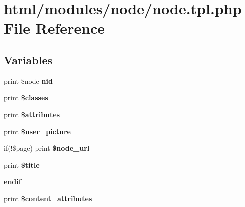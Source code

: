 \hypertarget{modules_2node_2node_8tpl_8php}{
\section{html/modules/node/node.tpl.php File Reference}
\label{modules_2node_2node_8tpl_8php}
}
\subsection*{Variables}
\begin{DoxyCompactItemize}
\item 
\hypertarget{modules_2node_2node_8tpl_8php_aff83bc4c67cdf5b085d181488eea273f}{
print \$node {\bfseries nid}}
\label{modules_2node_2node_8tpl_8php_aff83bc4c67cdf5b085d181488eea273f}

\item 
\hypertarget{modules_2node_2node_8tpl_8php_a6d48ecbdbc70ca1812e665169b5fa1e2}{
print {\bfseries \$classes}}
\label{modules_2node_2node_8tpl_8php_a6d48ecbdbc70ca1812e665169b5fa1e2}

\item 
\hypertarget{modules_2node_2node_8tpl_8php_a9c88c4272fa40546577b45392a0b3cd3}{
print {\bfseries \$attributes}}
\label{modules_2node_2node_8tpl_8php_a9c88c4272fa40546577b45392a0b3cd3}

\item 
\hypertarget{modules_2node_2node_8tpl_8php_a2662269aca0f9faedd1ee9e41828ea4c}{
print {\bfseries \$user\_\-picture}}
\label{modules_2node_2node_8tpl_8php_a2662269aca0f9faedd1ee9e41828ea4c}

\item 
\hypertarget{modules_2node_2node_8tpl_8php_aef4d429b668c3d734db6c8cb02ed1f41}{
if(!\$page) print {\bfseries \$node\_\-url}}
\label{modules_2node_2node_8tpl_8php_aef4d429b668c3d734db6c8cb02ed1f41}

\item 
\hypertarget{modules_2node_2node_8tpl_8php_aec2795512d255332f57cacd930a090b4}{
print {\bfseries \$title}}
\label{modules_2node_2node_8tpl_8php_aec2795512d255332f57cacd930a090b4}

\item 
\hypertarget{modules_2node_2node_8tpl_8php_af5de0099ee7326452097b37d1780920d}{
{\bfseries endif}}
\label{modules_2node_2node_8tpl_8php_af5de0099ee7326452097b37d1780920d}

\item 
\hypertarget{modules_2node_2node_8tpl_8php_ae2ee2e16f11937564281332a76a658e8}{
print {\bfseries \$content\_\-attributes}}
\label{modules_2node_2node_8tpl_8php_ae2ee2e16f11937564281332a76a658e8}

\end{DoxyCompactItemize}


